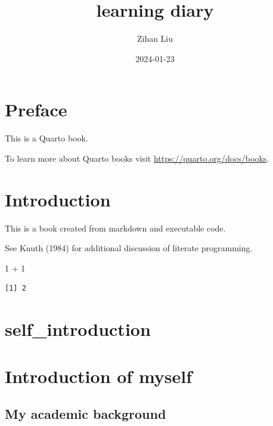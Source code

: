 \documentclass[
  letterpaper,
  DIV=11,
  numbers=noendperiod]{scrreprt}
\title{learning diary}
\author{Zihan Liu}
\date{2024-01-23}
\newenvironment{Shaded}{\begin{snugshade}}{\end{snugshade}}
\newcommand{\DecValTok}[1]{\textcolor[rgb]{0.68,0.00,0.00}{#1}}
\newcommand{\SpecialCharTok}[1]{\textcolor[rgb]{0.37,0.37,0.37}{#1}}
\renewcommand*\contentsname{Table of contents}
\newcommand\contentsname{Table of contents}
\begin{document}
\maketitle

\renewcommand*\contentsname{Table of contents}
{
\hypersetup{linkcolor=}
\setcounter{tocdepth}{2}
\tableofcontents
}

\chapter*{Preface}\label{preface}


This is a Quarto book.

To learn more about Quarto books visit
\url{https://quarto.org/docs/books}.


\chapter{Introduction}\label{introduction}

This is a book created from markdown and executable code.

See Knuth (1984) for additional discussion of literate programming.

\begin{Shaded}
\begin{Highlighting}[]
\DecValTok{1} \SpecialCharTok{+} \DecValTok{1}
\end{Highlighting}
\end{Shaded}

\begin{verbatim}
[1] 2
\end{verbatim}


\chapter{self\_introduction}\label{self_introduction}


\chapter{Introduction of myself}\label{introduction-of-myself}

\section{My academic background}\label{my-academic-background}
\end{document}

